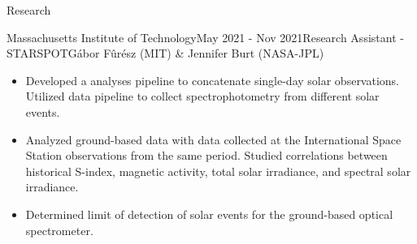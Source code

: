 \documentclass{resume} %
\begin{document}
\begin{rSection}{Research}
\begin{rSubsection}{Massachusetts Institute of Technology}{May 2021 - Nov 2021}{Research Assistant - STARSPOT}{G\'abor F\^ur\'esz (MIT) \& Jennifer Burt (NASA-JPL)}
\begin{itemize}
\item Developed a analyses pipeline to concatenate single-day solar observations. Utilized data pipeline to collect spectrophotometry from different solar events.
\item Analyzed ground-based data with data collected at the International Space Station observations from the same period. Studied correlations between historical S-index, magnetic activity, total solar irradiance, and spectral solar irradiance.
\item Determined limit of detection of solar events for the ground-based optical spectrometer.
\end{itemize}
\end{rSubsection}



\end{rSection}
\end{document}
